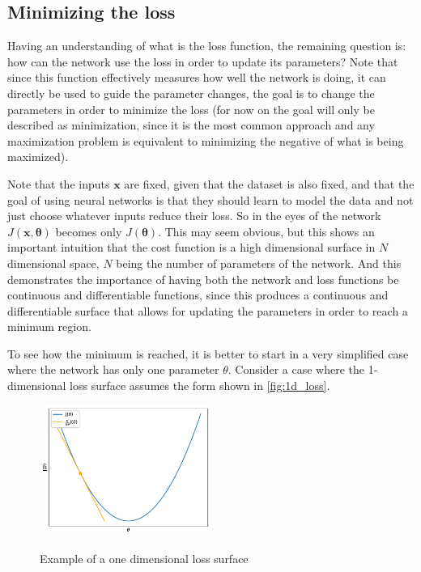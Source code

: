 \subsection{Minimizing the loss} \label{sub:minimizing_loss}
Having an understanding of what is the loss function, the remaining question is: how can the network use the loss in order to update its parameters? Note that since this function effectively measures how well the network is doing, it can directly be used to guide the parameter changes, the goal is to change the parameters in order to minimize the loss (for now on the goal will only be described as minimization, since it is the most common approach and any maximization problem is equivalent to minimizing the negative of what is being maximized).

Note that the inputs $\bm{x}$ are fixed, given that the dataset is also fixed, and that the goal of using neural networks is that they should learn to model the data and not just choose whatever inputs reduce their loss. So in the eyes of the network $J(\bm{x}, \bm{\theta})$ becomes only $J(\bm{\theta})$. This may seem obvious, but this shows an important intuition that the cost function is a high dimensional surface in $N$ dimensional space, $N$ being the number of parameters of the network. And this demonstrates the importance of having both the network and loss functions be continuous and differentiable functions, since this produces a continuous and differentiable surface that allows for updating the parameters in order to reach a minimum region.

To see how the minimum is reached, it is better to start in a very simplified case where the network has only one parameter $\theta$. Consider a case where the 1-dimensional loss surface assumes the form shown in \autoref{fig:1d_loss}.
\begin{figure}
    \centering
    \caption{Example of a one dimensional loss surface}
    \includegraphics[width=0.5\textwidth]{chapters/NeuralNets/figures/1D-Loss.pdf}
    \label{fig:1d_loss}
\end{figure}

